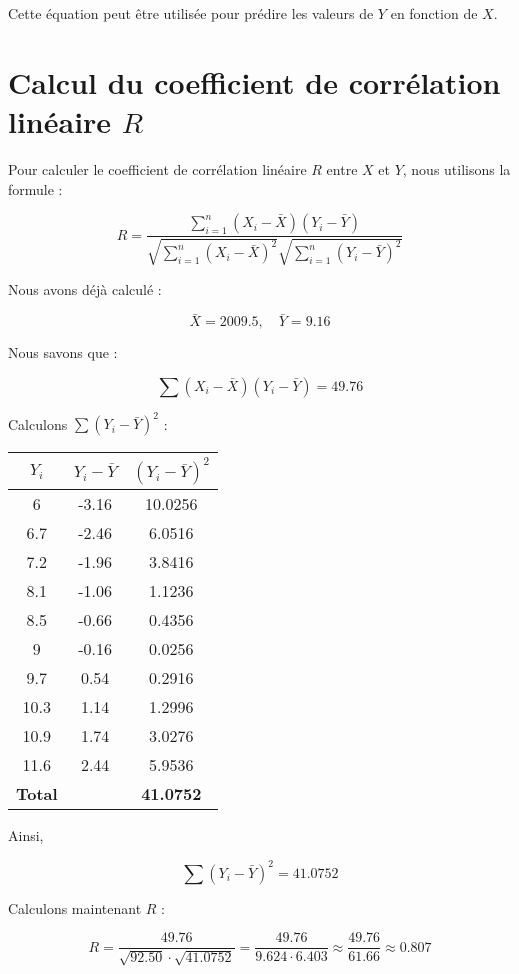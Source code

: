 \documentclass[12pt]{article}
\begin{document}
Cette équation peut être utilisée pour prédire les valeurs de \(Y\) en fonction de \(X\).

\section*{Calcul du coefficient de corrélation linéaire \(R\)}

Pour calculer le coefficient de corrélation linéaire \(R\) entre \(X\) et \(Y\), nous utilisons la formule :

\[
R = \frac{\sum_{i=1}^{n} (X_i - \bar{X})(Y_i - \bar{Y})}{\sqrt{\sum_{i=1}^{n} (X_i - \bar{X})^2} \sqrt{\sum_{i=1}^{n} (Y_i - \bar{Y})^2}}
\]

Nous avons déjà calculé :

\[
\bar{X} = 2009.5, \quad \bar{Y} = 9.16
\]

Nous savons que :

\[
\sum (X_i - \bar{X})(Y_i - \bar{Y}) = 49.76
\]

Calculons \(\sum (Y_i - \bar{Y})^2\) :

\begin{table}[h]
    \centering
    \begin{tabular}{|c|c|c|}
        \hline
        \(Y_i\) & \(Y_i - \bar{Y}\) & \((Y_i - \bar{Y})^2\) \\
        \hline
        6 & -3.16 & 10.0256 \\
        6.7 & -2.46 & 6.0516 \\
        7.2 & -1.96 & 3.8416 \\
        8.1 & -1.06 & 1.1236 \\
        8.5 & -0.66 & 0.4356 \\
        9 & -0.16 & 0.0256 \\
        9.7 & 0.54 & 0.2916 \\
        10.3 & 1.14 & 1.2996 \\
        10.9 & 1.74 & 3.0276 \\
        11.6 & 2.44 & 5.9536 \\
        \hline
        \textbf{Total} & & \textbf{41.0752} \\
        \hline
    \end{tabular}
\end{table}

Ainsi,

\[
\sum (Y_i - \bar{Y})^2 = 41.0752
\]

Calculons maintenant \(R\) :

\[
R = \frac{49.76}{\sqrt{92.50} \cdot \sqrt{41.0752}} = \frac{49.76}{9.624 \cdot 6.403} \approx \frac{49.76}{61.66} \approx 0.807
\]
\end{document}
